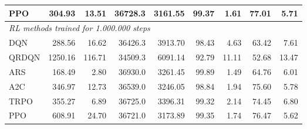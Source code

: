 \begin{samepage}
\begin{center}
\begin{tabular}{l|rr|rr|rr|rr}
    PPO          &   304.93 &    13.51 &    36728.3 &    3161.55 &   99.37 &    1.61 &   77.01 &    5.71 \\
    \midrule
    \multicolumn{9}{l}{\textit{RL methods trained for 1.000.000 steps}} \\
    \midrule
    DQN          &   288.56 &    16.62 &    36426.3 &    3913.70 &   98.43 &    4.63 &   63.42 &    7.61 \\
    QRDQN        &  1250.16 &   116.71 &    34509.3 &    6091.14 &   92.79 &   11.11 &   52.68 &   13.47 \\
    ARS          &   168.49 &     2.80 &    36930.0 &    3261.45 &   99.89 &    1.49 &   64.76 &    6.01 \\
    A2C          &   346.97 &    12.73 &    36539.0 &    3246.05 &   98.84 &    1.94 &   75.60 &    5.78 \\
    TRPO         &   355.27 &     6.89 &    36725.0 &    3396.31 &   99.32 &    2.14 &   74.45 &    6.80 \\
    PPO          &   608.91 &    24.70 &    36721.0 &    3173.89 &   99.35 &    1.74 &   76.47 &    5.62 \\
    \bottomrule
  \end{tabular}
\end{center}
\end{samepage}

